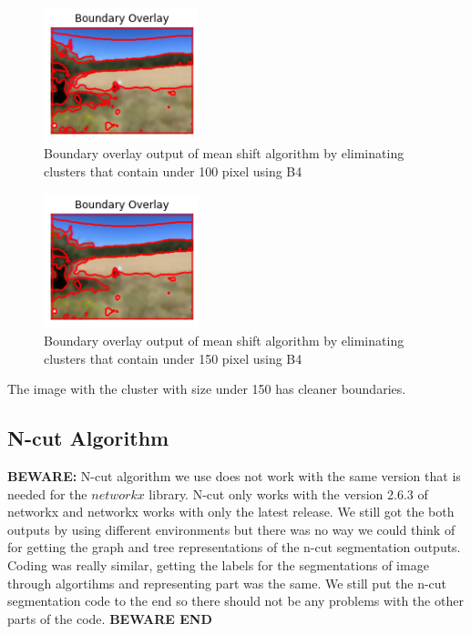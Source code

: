\documentclass[conference]{IEEEtran}
\begin{document}
\begin{figure}[h]
        \centering
        \includegraphics[width=0.4\textwidth]{resources/2_b.png}
        \caption{Boundary overlay output of mean shift algorithm by eliminating clusters that contain under 100 pixel using B4}
        \label{fig:2_b}
    \end{figure}

\begin{figure}[h]
        \centering 
        \includegraphics[width=0.4\textwidth]{resources/3_b.png}
        \caption{Boundary overlay output of mean shift algorithm by eliminating clusters that contain under 150 pixel using B4}
        \label{fig:3_b}
    \end{figure}

The image with the cluster with size under 150 has cleaner boundaries. 

\subsection{N-cut Algorithm}
\textbf{BEWARE: } N-cut algorithm we use does not work with the same version that is needed for the $networkx$ library. N-cut only works with the version 2.6.3 of networkx and networkx works with only the latest release. We still got the both outputs by using different environments but there was no way we could think of for getting the graph and tree representations of the n-cut segmentation outputs. Coding was really similar, getting the labels for the segmentations of image through algortihms and representing part was the same. We still put the n-cut segmentation code to the end so there should not be any problems with the other parts of the code.
\textbf{BEWARE END}
\end{document}

